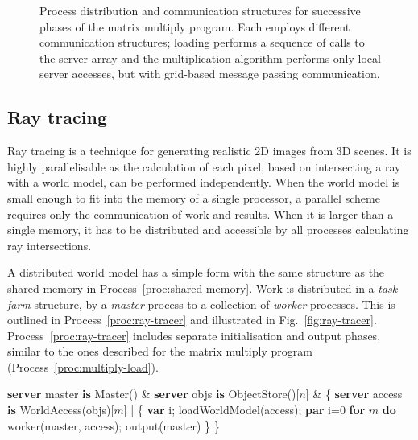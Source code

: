 \documentclass[11pt, conference, compsocconf, onecolumn]{IEEEtran}
\newcommand{\fig}[1]{Fig.~\ref{fig:#1}}
\newcommand{\proc}[1]{Process~\ref{proc:#1}}
\newcounter{process}
\newenvironment{Process}[1][]{\begin{procfloat}[ht]\vspace{-1.5mm}\refstepcounter{process}{\bf Process~\theprocess} #1}
{\vspace{-3.5mm}\end{procfloat}}
\newcommand{\w}[1]{{\bf #1}}
\def\codespacing{1.5mm}
\newenvironment{myquote}
{\list{}{\leftmargin=4mm\rightmargin=4mm}\item[]}
{\endlist}
\newenvironment{code*}{\vspace{\codespacing}\begin{myquote}\begin{minipage}{\linewidth}\begin{alltt}}
{\end{alltt}\end{minipage}
\end{myquote}\vspace{\codespacing}
}
\begin{document}
\begin{figure*}[t]
{ \label{fig:multiply-comp}}

\caption{Process distribution and communication structures for successive
  phases of the matrix multiply program. Each employs different communication
  structures; loading performs a sequence of calls to the server array and the
  multiplication algorithm performs only local server accesses, but with
grid-based message passing communication.}

\label{fig:multiply-phases}
\end{figure*}

\subsection{Ray tracing}

Ray tracing is a technique for generating realistic 2D images from 3D scenes.
It is highly parallelisable as the calculation of each pixel, based on
intersecting a ray with a world model, can be performed independently. When
the world model is small enough to fit into the memory of a single
processor, a parallel scheme requires only the communication of work and
results. 
When it is larger than a single memory, it has to be distributed and accessible
by all processes calculating ray intersections.

A distributed world model has a simple form with the same structure as
the shared memory in \proc{shared-memory}.  Work is distributed in a
\emph{task farm} structure, by a \emph{master} process to a collection of
\emph{worker} processes. 
This is outlined in \proc{ray-tracer} and illustrated in \fig{ray-tracer}.
\proc{ray-tracer} includes separate initialisation and output phases, similar to
the ones described for the matrix multiply program (\proc{multiply-load}). 
\begin{Process}
\begin{code*}
\w{server} master \w{is} Master() &
\w{server} objs \w{is} ObjectStore()[\(n\)] &
\{ \w{server} access \w{is} WorldAccess(objs)[\(m\)] |
  \{ \w{var} i;
    loadWorldModel(access);
    \w{par} i=0 \w{for} \(m\) \w{do}
      worker(master, access);
    output(master)
  \}
\}
\end{code*}
\label{proc:ray-tracer}
\end{Process}
\end{document}
